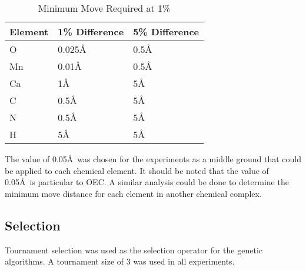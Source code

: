 \begin{table}
\caption{Minimum Move Required at 1\%}
\label{table:minMove}
\centering
\normalsize
\begin{tabular}{ | l | l | l | }
  \hline
    Element & 1\% Difference & 5\% Difference \\ \hline
    O & 0.025\AA & 0.5\AA \\ \hline
    Mn & 0.01\AA & 0.5\AA \\ \hline
    Ca & 1\AA & 5\AA \\ \hline
    C & 0.5\AA & 5\AA \\ \hline
    N & 0.5\AA & 5\AA \\ \hline
    H & 5\AA & 5\AA \\ \hline
\end{tabular}
\end{table}

The value of 0.05\AA\ was chosen for the experiments as a middle ground that could be applied to each chemical element. It should be noted that the value of 0.05\AA\ is particular to OEC. A similar analysis could be done to determine the minimum move distance for each element in another chemical complex.

\subsection{Selection}

Tournament selection was used as the selection operator for the genetic algorithms. A tournament size of 3 was used in all experiments.